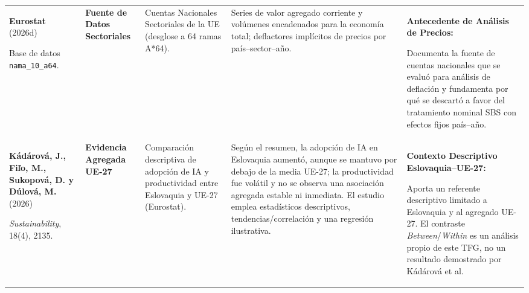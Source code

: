 \documentclass[10pt,a4paper,landscape]{article}
\begin{document}
\begin{xltabular}{\textwidth}{@{} L{4.5cm} L{3.3cm} Y Y Y @{}}
  \textbf{Eurostat} (2026d)\par
  Base de datos \texttt{nama\_10\_a64}.\par
  [\texttt{eurostat\_nama}] &
  \textbf{Fuente de Datos Sectoriales} &
  Cuentas Nacionales Sectoriales de la UE (desglose a 64 ramas A*64). &
  Series de valor agregado corriente y volúmenes encadenados para la economía total; deflactores implícitos de precios por país--sector--año. &
  \textbf{Antecedente de Análisis de Precios:}\par
  Documenta la fuente de cuentas nacionales que se evaluó para análisis de deflación y fundamenta por qué se descartó a favor del tratamiento nominal SBS con efectos fijos país--año. \\
  \textbf{Kádárová, J., Fiľo, M., Sukopová, D. y Dúlová, M.} (2026)\par
  \textit{Sustainability}, 18(4), 2135.\par
  [\texttt{kadarova2026slovakia}] &
  \textbf{Evidencia Agregada UE-27} &
  Comparación descriptiva de adopción de IA y productividad entre Eslovaquia y UE-27 (Eurostat). &
  Según el resumen, la adopción de IA en Eslovaquia aumentó, aunque se mantuvo por debajo de la media UE-27; la productividad fue volátil y no se observa una asociación agregada estable ni inmediata. El estudio emplea estadísticos descriptivos, tendencias/correlación y una regresión ilustrativa. &
  \textbf{Contexto Descriptivo Eslovaquia--UE-27:}\par
  Aporta un referente descriptivo limitado a Eslovaquia y al agregado UE-27. El contraste \textit{Between}/\textit{Within} es un análisis propio de este TFG, no un resultado demostrado por Kádárová et al. \\


\end{xltabular}
\end{document}
